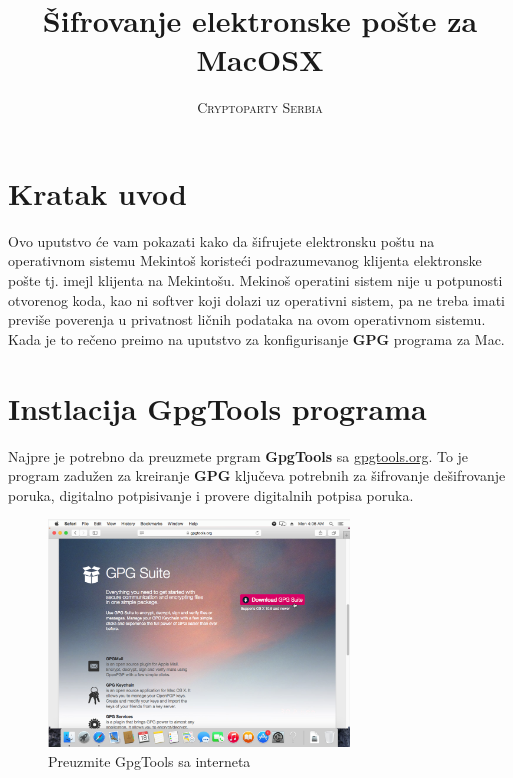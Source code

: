 \documentclass[a4paper,11pt]{article}
\title{\Huge \textbf{\v{S}ifrovanje elektronske po\v{s}te za MacOSX}}
\author{\textsc{Cryptoparty Serbia}}
\begin{document}
\maketitle
\tableofcontents

\newpage

\section{Kratak uvod}
Ovo uputstvo \'{c}e vam pokazati kako da \v{s}ifrujete elektronsku po\v{s}tu na operativnom sistemu Mekinto\v{s} koriste\'{c}i podrazumevanog klijenta elektronske po\v{s}te tj. imejl klijenta na Mekinto\v{s}u.\newline
Mekino\v{s} operatini sistem nije u potpunosti otvorenog koda, kao ni softver koji dolazi uz operativni sistem, pa ne treba imati previ\v{s}e poverenja u privatnost li\v{c}nih podataka na ovom operativnom sistemu.
Kada je to re\v{c}eno pre\dj{}imo na uputstvo za konfigurisanje \textbf{GPG} programa za Mac.
\newpage
\section{Instlacija GpgTools programa}
Najpre je potrebno da preuzmete prgram \textbf{GpgTools} sa \href{https://gpgtools.org}{gpgtools.org}. \newline
To je program zadu\v{z}en za kreiranje \textbf{GPG} klju\v{c}eva potrebnih za \textsf{\v{s}ifrovanje} \textsf{de\v{s}ifrovanje} poruka, \textsf{digitalno potpisivanje} i \textsf{provere digitalnih potpisa} poruka.

\begin{figure}[!h]
	\begin{center}
		\includegraphics[width=8cm]{01_Oracle_VM_VirtualBox.png}
		\caption{Preuzmite GpgTools sa interneta}
		\label{gpgtools_download1}
	\end{center}
\end{figure}
\end{document}
